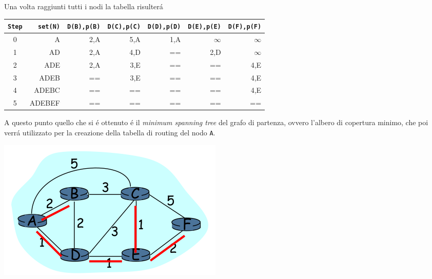 \documentclass[12pt]{article}
\def\code#1{\texttt{#1}}
\begin{document}
Una volta raggiunti tutti i nodi la tabella risulter\'a
\begin{center}
\renewcommand{\arraystretch}{1.2}%
\begin{tabular}{ c r r r r r r }
	\code{Step} & \code{set(N)} & \code{D(B),p(B)} & \code{D(C),p(C)} & \code{D(D),p(D)} & \code{D(E),p(E)} & 
	\code{D(F),p(F)}\\ \hline

	0 &      A & 2,A              & 5,A              & {\color{red}1,A} & $\infty$         & $\infty$         \\ \hline
	1 &     AD & 2,A              & 4,D              & ==               & {\color{red}2,D} & $\infty$         \\ \hline
	2 &    ADE & {\color{red}2,A} & 3,E              & ==               & ==               & 4,E              \\ \hline
	3 &   ADEB & ==               & {\color{red}3,E} & ==               & ==               & 4,E              \\ \hline
	4 &  ADEBC & ==               & ==               & ==               & ==               & {\color{red}4,E} \\ \hline
	5 & ADEBEF & ==               & ==               & ==               & ==               & ==               \\ \hline
\end{tabular}
\end{center}
A questo punto quello che si \'e ottenuto \'e il \textit{minimum spanning tree} del grafo di partenza, ovvero l'albero di 
copertura minimo, che poi verr\'a utilizzato per la creazione della tabella di routing del nodo \code{A}.

\begin{center}
	\includegraphics[scale=0.5]{livello_di_rete-img15.png}
\end{center}
\end{document}
